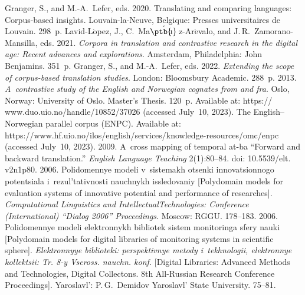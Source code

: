 \begin{multicols}{2}
{{\begin{thebibliography}{99}
Granger, S., and M.-A.~Lefer, eds. 2020. Translating and comparing languages: Corpus-based 
insights. Louvain-la-Neuve, Belgique: Presses universitaires de Louvain. 298~p.
Lavid-L$\acute{\mbox{o}}$pez, J., C.~\mbox{Ma$\acute{\mbox{\ptb{\!\i}}}$\,z}-Ar$\acute{\mbox{e}}$valo, and J.\,R.~Zamorano-Mansilla, eds. 2021. \textit{Corpora in 
translation and contrastive research in the digital age: Recent advances and explorations}. 
Amsterdam, Philadelphia: John Benjamins. 351~p.
Granger, S., and M.-A.~Lefer, eds. 2022. \textit{Extending the scope of corpus-based translation 
studies}. London: Bloomsbury Academic. 288~p.
 2013. \textit{A~contrastive study of the English and Norwegian cognates from 
and fra}.  Oslo, Norway: University of Oslo. Master's Thesis. 120~p. Available at:  {\sf 
https:// www.duo.uio.no/handle/10852/37026} (accessed July~10, 2023).
The English--Norwegian parallel corpus (\mbox{ENPC}). Available at:   {\sf 
https://www.hf.uio.no/ilos/english/services/\linebreak  knowledge-resources/omc/enpc} (accessed July~10, 2023).
 2009. A~cross mapping of temporal at-ba ``Forward and 
backward translation.'' \textit{English Language Teaching} 2(1):80--84. doi: 10.5539/elt. v2n1p80.
 2006. Po\-li\-do\-men\-nye modeli v~sis\-te\-makh otsen\-ki  
in\-no\-va\-tsi\-on\-no\-go po\-ten\-tsi\-a\-la i~re\-zul'\-ta\-tiv\-nosti na\-uch\-nykh is\-sle\-do\-va\-niy 
[Polydomain models for evaluation systems of innovative potential and performance of researches]. 
\textit{Computational Linguistics and Intellectual\linebreak Technologies:   Conference (International) ``Dialog 2006'' 
Proceedings}. Moscow: RGGU. 178--183.
 2006. Po\-li\-do\-men\-nye mo\-de\-li elekt\-ron\-nykh bib\-lio\-tek  
sis\-tem mo\-ni\-to\-rin\-ga sfe\-ry nau\-ki [Polydomain models for digital libraries of monitoring 
systems in scientific sphere]. \textit{Elektronnyye biblioteki: perspektivnye metody i~tekhnologii, 
elektronnye kollektsii: Tr. 8-y Vseross. nauchn. konf.} [Digital Libraries: Advanced Methods and 
Technologies, Digital Collectons. 8th All-Russian Research Conference Proceedings]. Yaroslavl': P.\,G.~Demidov Yaroslavl' State University. 
75--81.
\end{thebibliography}}}
\end{multicols}
